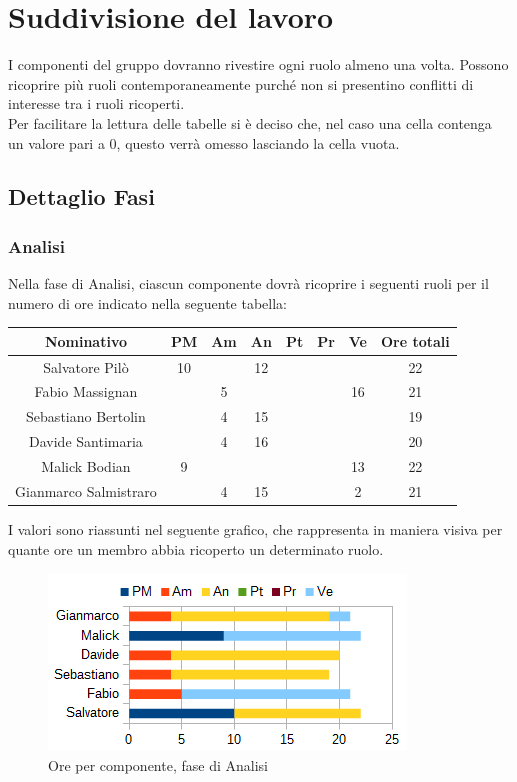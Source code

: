 \section{Suddivisione del lavoro}
I componenti del gruppo dovranno rivestire ogni ruolo almeno una volta. Possono ricoprire più ruoli contemporaneamente purché non si presentino conflitti di interesse tra i ruoli ricoperti. \\
Per facilitare la lettura delle tabelle si è deciso che, nel caso una cella contenga un valore pari a 0, questo verrà omesso lasciando la cella vuota.
	\subsection{Dettaglio Fasi}
		\subsubsection{Analisi}
		Nella fase di Analisi, ciascun componente dovrà ricoprire i seguenti ruoli per il numero di ore indicato nella seguente tabella: \\
		\begin{table}[H]
		\centering
		\begin{tabular}{|c|c|c|c|c|c|c|c|}
			\hline
			\textbf{Nominativo}		& \textbf{PM}	& \textbf{Am}	& \textbf{An}	& \textbf{Pt}	& \textbf{Pr}	& \textbf{Ve}	& \textbf{Ore totali}     \\
			\hline
			Salvatore Pilò			& 10	& 		& 12	&		&		&		& 22 \\
			Fabio Massignan			&		& 5		&		&		&		& 16	& 21 \\
			Sebastiano Bertolin		&		& 4		& 15	&		&		&		& 19 \\
			Davide Santimaria		&		& 4		& 16	&		&		&		& 20 \\
			Malick Bodian			& 9		&		&		&		&		& 13	& 22 \\
			Gianmarco Salmistraro	&		& 4		& 15	&		&		& 2		& 21 \\
			\hline
		\end{tabular}
		\end{table}
		I valori sono riassunti nel seguente grafico, che rappresenta in maniera visiva per quante ore un membro abbia ricoperto un determinato ruolo. \\
		\begin{figure}[H]
			\centering
			\includegraphics[width=1\linewidth]{immagini/grafici/analisi-barra.png}
			\caption{Ore per componente, fase di Analisi}
		\end{figure}
